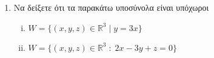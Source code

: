 \begin{enumerate}
    \item Να δείξετε ότι τα παρακάτω υποσύνολα είναι υπόχωροι
        \begin{enumerate}[(i)]
            \item $ W = \{ (x,y,z) \in \mathbb{R}^{3} \mid y = 3x \} $ 
            \item $ W = \{(x,y,z)\in \mathbb{R}^{3} \; : \; 2x-3y+z=0 \} $
        \end{enumerate}
\end{enumerate}


